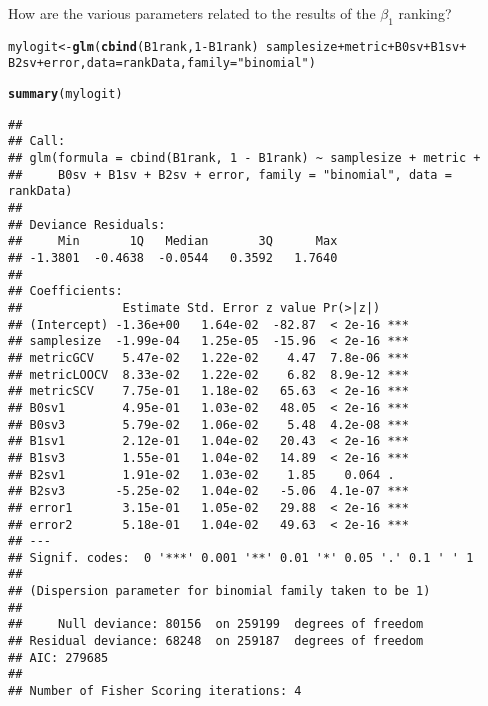 \documentclass{article}\usepackage[]{graphicx}\usepackage[]{color}
\makeatletter
\newcommand{\hlnum}[1]{\textcolor[rgb]{0.686,0.059,0.569}{#1}}%
\newcommand{\hlstr}[1]{\textcolor[rgb]{0.192,0.494,0.8}{#1}}%
\newcommand{\hlopt}[1]{\textcolor[rgb]{0,0,0}{#1}}%
\newcommand{\hlstd}[1]{\textcolor[rgb]{0.345,0.345,0.345}{#1}}%
\newcommand{\hlkwb}[1]{\textcolor[rgb]{0.69,0.353,0.396}{#1}}%
\newcommand{\hlkwc}[1]{\textcolor[rgb]{0.333,0.667,0.333}{#1}}%
\newcommand{\hlkwd}[1]{\textcolor[rgb]{0.737,0.353,0.396}{\textbf{#1}}}%
\newenvironment{kframe}{%
 \def\at@end@of@kframe{}%
 \ifinner\ifhmode%
  \def\at@end@of@kframe{\end{minipage}}%
  \begin{minipage}{\columnwidth}%
 \fi\fi%
 \def\FrameCommand##1{\hskip\@totalleftmargin \hskip-\fboxsep
 \colorbox{shadecolor}{##1}\hskip-\fboxsep
     \hskip-\linewidth \hskip-\@totalleftmargin \hskip\columnwidth}%
 \MakeFramed {\advance\hsize-\width
   \@totalleftmargin\z@ \linewidth\hsize
   \@setminipage}}%
 {\par\unskip\endMakeFramed%
 \at@end@of@kframe}
\newenvironment{knitrout}{}{} %
\makeatother
\begin{document}
How are the various parameters related to the results of the $\beta _1$ ranking?
\begin{knitrout}
\color{fgcolor}\begin{kframe}
\begin{alltt}
\hlstd{mylogit} \hlkwb{<-} \hlkwd{glm}\hlstd{(}\hlkwd{cbind}\hlstd{(B1rank,} \hlnum{1} \hlopt{-} \hlstd{B1rank)} \hlopt{~} \hlstd{samplesize} \hlopt{+} \hlstd{metric} \hlopt{+} \hlstd{B0sv} \hlopt{+} \hlstd{B1sv} \hlopt{+}
    \hlstd{B2sv} \hlopt{+} \hlstd{error,} \hlkwc{data} \hlstd{= rankData,} \hlkwc{family} \hlstd{=} \hlstr{"binomial"}\hlstd{)}
\end{alltt}


{\ttfamily\noindent\color{warningcolor}{\#\# Warning: non-integer counts in a binomial glm!}}\begin{alltt}
\hlkwd{summary}\hlstd{(mylogit)}
\end{alltt}
\begin{verbatim}
## 
## Call:
## glm(formula = cbind(B1rank, 1 - B1rank) ~ samplesize + metric + 
##     B0sv + B1sv + B2sv + error, family = "binomial", data = rankData)
## 
## Deviance Residuals: 
##     Min       1Q   Median       3Q      Max  
## -1.3801  -0.4638  -0.0544   0.3592   1.7640  
## 
## Coefficients:
##              Estimate Std. Error z value Pr(>|z|)    
## (Intercept) -1.36e+00   1.64e-02  -82.87  < 2e-16 ***
## samplesize  -1.99e-04   1.25e-05  -15.96  < 2e-16 ***
## metricGCV    5.47e-02   1.22e-02    4.47  7.8e-06 ***
## metricLOOCV  8.33e-02   1.22e-02    6.82  8.9e-12 ***
## metricSCV    7.75e-01   1.18e-02   65.63  < 2e-16 ***
## B0sv1        4.95e-01   1.03e-02   48.05  < 2e-16 ***
## B0sv3        5.79e-02   1.06e-02    5.48  4.2e-08 ***
## B1sv1        2.12e-01   1.04e-02   20.43  < 2e-16 ***
## B1sv3        1.55e-01   1.04e-02   14.89  < 2e-16 ***
## B2sv1        1.91e-02   1.03e-02    1.85    0.064 .  
## B2sv3       -5.25e-02   1.04e-02   -5.06  4.1e-07 ***
## error1       3.15e-01   1.05e-02   29.88  < 2e-16 ***
## error2       5.18e-01   1.04e-02   49.63  < 2e-16 ***
## ---
## Signif. codes:  0 '***' 0.001 '**' 0.01 '*' 0.05 '.' 0.1 ' ' 1
## 
## (Dispersion parameter for binomial family taken to be 1)
## 
##     Null deviance: 80156  on 259199  degrees of freedom
## Residual deviance: 68248  on 259187  degrees of freedom
## AIC: 279685
## 
## Number of Fisher Scoring iterations: 4
\end{verbatim}
\end{kframe}
\end{knitrout}
\end{document}
